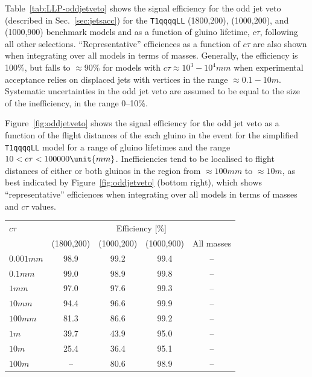 Table~\ref{tab:LLP-oddjetveto} shows the signal efficiency for the odd
jet veto (described in Sec.~\ref{sec:jetsacc}) for the
\texttt{T1qqqqLL} (1800,200), (1000,200), and (1000,900) benchmark
models and as a function of gluino lifetime, $c\tau$, following all
other selections. ``Representative'' efficiences as a function of
$c\tau$ are also shown when integrating over all models in terms of
masses.  Generally, the efficiency is 100\%, but falls to
${\approx}90\%$ for models with $c\tau \approx 10^{3} -
10^{4}\unit{mm}$ when experimental acceptance relies on displaced jets
with vertices in the range $\approx 0.1-10\unit{m}$. Systematic
uncertainties in the odd jet veto are assumed to be equal to the size
of the inefficiency, \ie in the range 0--10\%.

Figure~\ref{fig:oddjetveto} shows the signal efficiency for the odd
jet veto as a function of the flight distances of the each gluino in
the event for the simplified \texttt{T1qqqqLL} model for a range of
gluino lifetimes and the range $10 < \ctau <
100000\unit{mm}$. Inefficiencies tend to be localised to flight
distances of either or both gluinos in the region from
${\approx}100\unit{mm}$ to ${\approx}10\unit{m}$, as best indicated by
Figure~\ref{fig:oddjetveto} (bottom right), which shows
``representative'' efficiences when integrating over all models in
terms of masses and $c\tau$ values.

\clearpage
\begin{table}[h!]
  \centering
  \begin{tabular}{lcccc} 
    \hline
    $c\tau$          & \multicolumn{4}{c}{Efficiency [\%]}               \\
    \cline{2-5}
                     & (1800,200) & (1000,200) & (1000,900) & All masses \\
    \hline
    $0.001\unit{mm}$ & 98.9       & 99.2       & 99.4       & --         \\
    $0.1\unit{mm}$   & 99.0       & 98.9       & 99.8       & --         \\
    $1\unit{mm}$     & 97.0       & 97.6       & 99.3       & --         \\
    $10\unit{mm}$    & 94.4       & 96.6       & 99.9       & --         \\
    $100\unit{mm}$   & 81.3       & 86.6       & 99.2       & --         \\
    $1\unit{m}$      & 39.7       & 43.9       & 95.0       & --         \\
    $10\unit{m}$     & 25.4       & 36.4       & 95.1       & --         \\
    $100\unit{m}$    & --         & 80.6       & 98.9       & --         \\
    \hline
  \end{tabular}
  \label{tab:LLP-chf}
\end{table}

